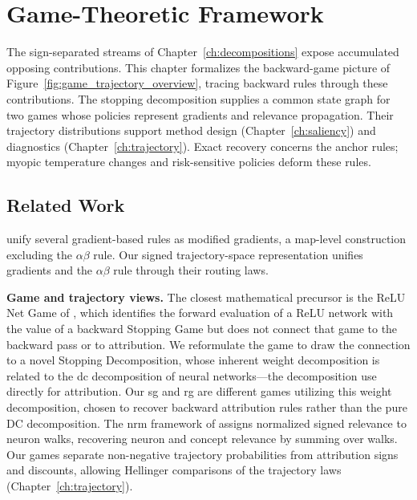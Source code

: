 \chapter{Game-Theoretic Framework}\label{ch:game_theory}\label{app:supp_games}

The sign-separated streams of Chapter~\ref{ch:decompositions} expose accumulated opposing contributions. This chapter formalizes the backward-game picture of Figure~\ref{fig:game_trajectory_overview}, tracing backward rules through these contributions. The stopping decomposition supplies a common state graph for two games whose policies represent gradients and relevance propagation. Their trajectory distributions support method design (Chapter~\ref{ch:saliency}) and diagnostics (Chapter~\ref{ch:trajectory}). Exact recovery concerns the anchor rules; myopic temperature changes and risk-sensitive policies deform these rules.

\section{Related Work}\label{ptnb:sec:related-work}\label{sec:related_work_games}

\textcite{Ancona2018} unify several gradient-based rules as modified gradients, a map-level construction excluding the $\alpha\beta$ rule. Our signed trajectory-space representation unifies gradients and the $\alpha\beta$ rule through their routing laws.

\textbf{Game and trajectory views.} The closest mathematical precursor is the ReLU Net Game of
\textcite{Gaubert2025}, which identifies the forward evaluation of a ReLU network with the value of a
backward Stopping Game but does not connect that game to the backward pass or to attribution. We
reformulate the game to draw the connection to a novel Stopping Decomposition, whose inherent
weight decomposition is related to the \ac{dc} decomposition of neural networks---the decomposition
\textcite{hiddenMono} use directly for attribution. Our \ac{sg} and \ac{rg} are different games
utilizing this weight decomposition, chosen to recover backward attribution rules rather than the
pure DC decomposition.
The \ac{nrm} framework of \textcite{Xiong2026nrm} assigns normalized signed relevance to neuron walks, recovering neuron and concept relevance by summing over walks. Our games separate non-negative trajectory probabilities from attribution signs and discounts, allowing Hellinger comparisons of the trajectory laws (Chapter~\ref{ch:trajectory}).

